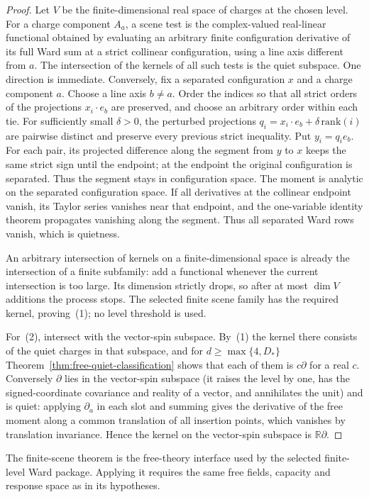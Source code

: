 \begin{proof}
Let $V$ be the finite-dimensional real space of charges at the chosen
level.  For a charge component $A_a$, a scene test is the complex-valued
real-linear functional obtained by evaluating an arbitrary finite
configuration derivative of its full Ward sum at a strict collinear
configuration, using a line axis different from $a$.  The intersection of the kernels of all such tests is the
quiet subspace.  One direction is immediate.  Conversely, fix a separated
configuration $x$ and a charge component $a$.  Choose a line axis $b\ne a$.
Order the indices so that all strict
orders of the projections $x_i\cdot e_b$ are preserved, and choose an
arbitrary order within each tie.  For sufficiently small $\delta>0$, the
perturbed projections
$q_i=x_i\cdot e_b+\delta\,\mathrm{rank}(i)$ are pairwise distinct and
preserve every previous strict inequality.  Put $y_i=q_i e_b$.  For each
pair, its projected difference along the segment from $y$ to $x$ keeps the
same strict sign until the endpoint; at the endpoint the original
configuration is separated.  Thus the segment stays in configuration
space.
The moment is analytic on
the separated configuration space.  If all derivatives at the collinear
endpoint vanish, its Taylor series vanishes near that endpoint, and the
one-variable identity theorem propagates vanishing along the segment.
Thus all separated Ward rows vanish, which is quietness.

An arbitrary intersection of kernels on a finite-dimensional space is
already the intersection of a finite subfamily: add a functional whenever
the current intersection is too large.  Its dimension strictly drops,
so after at most $\dim V$ additions the process stops.  The selected
finite scene family has the required kernel, proving~(1); no level
threshold is used.

For~(2), intersect with the vector-spin subspace. By~(1) the kernel there
consists of the quiet charges in that subspace, and for
$d\geq\max\{4,D_*\}$ Theorem~\ref{thm:free-quiet-classification} shows
that each of them is $c\partial$ for a real $c$. Conversely $\partial$
lies in the vector-spin subspace (it raises the level by one, has the
signed-coordinate covariance and reality of a vector, and annihilates
the unit) and is quiet: applying $\partial_a$ in each slot and summing
gives the derivative of the free moment along a common translation of
all insertion points, which vanishes by translation invariance. Hence the
kernel on the vector-spin subspace is $\mathbb R\partial$.
\end{proof}

The finite-scene theorem is the free-theory interface used by the selected
finite-level Ward package. Applying it requires the same free fields,
capacity and response space as in its hypotheses.
